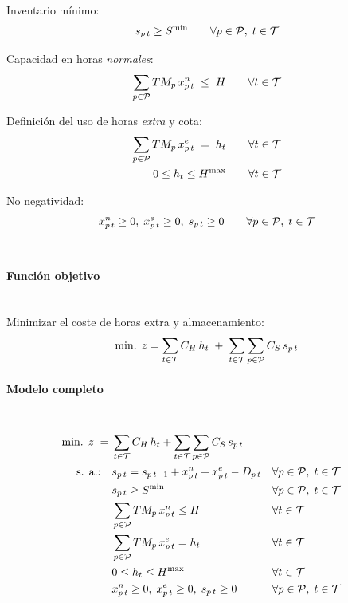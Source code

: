 Inventario mínimo:
\begin{align}
s_{p\,t} \ge S^{\min}
\qquad \forall p \in \mathcal{P},\; t \in \mathcal{T} \notag
\end{align}

Capacidad en horas \emph{normales}:
\begin{align}
\sum_{p \in \mathcal{P}} TM_p\,x^{n}_{p\,t} \;\le\; H
\qquad \forall t \in \mathcal{T} \notag
\end{align}

Definición del uso de horas \emph{extra} y cota:
\begin{align}
\sum_{p \in \mathcal{P}} TM_p\,x^{e}_{p\,t} \;=\; h_t
\qquad \forall t \in \mathcal{T} \notag\\
0 \le h_t \le H^{\max}
\qquad \forall t \in \mathcal{T} \notag
\end{align}

No negatividad:
\begin{align}
x^{n}_{p\,t} \ge 0,\; x^{e}_{p\,t} \ge 0,\; s_{p\,t} \ge 0
\qquad \forall p \in \mathcal{P},\; t \in \mathcal{T} \notag
\end{align}
\\

\paragraph{Función objetivo}\mbox{}\\
Minimizar el coste de horas extra y almacenamiento:
\begin{align}
\mbox{min. } z = \sum_{t \in \mathcal{T}} C_H\,h_t \;+\; \sum_{t \in \mathcal{T}} \sum_{p \in \mathcal{P}} C_S\,s_{p\,t} \notag
\end{align}

\paragraph{Modelo completo}\mbox{}\\
\begin{align}
\mbox{min. } z \;=\;& \sum_{t \in \mathcal{T}} C_H\,h_t + \sum_{t \in \mathcal{T}} \sum_{p \in \mathcal{P}} C_S\,s_{p\,t} \notag\\
\mbox{s. a.:}\quad
& s_{p\,t} = s_{p\,t-1} + x^{n}_{p\,t} + x^{e}_{p\,t} - D_{p\,t} && \forall p \in \mathcal{P},\; t \in \mathcal{T} \notag\\
& s_{p\,t} \ge S^{\min} && \forall p \in \mathcal{P},\; t \in \mathcal{T} \notag\\
& \sum_{p \in \mathcal{P}} TM_p\,x^{n}_{p\,t} \le H && \forall t \in \mathcal{T} \notag\\
& \sum_{p \in \mathcal{P}} TM_p\,x^{e}_{p\,t} = h_t && \forall t \in \mathcal{T} \notag\\
& 0 \le h_t \le H^{\max} && \forall t \in \mathcal{T} \notag\\
& x^{n}_{p\,t} \ge 0,\; x^{e}_{p\,t} \ge 0,\; s_{p\,t} \ge 0 && \forall p \in \mathcal{P},\; t \in \mathcal{T} \notag
\end{align}


